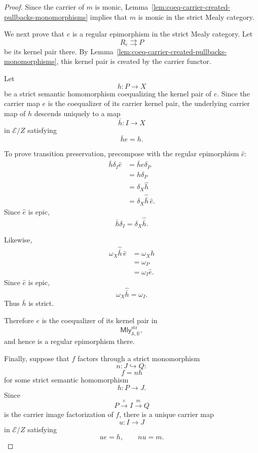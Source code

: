 \begin{proof}
    Since the carrier of \(m\) is monic,
    Lemma~\ref{lem:coeq-carrier-created-pullbacks-monomorphisms}
    implies that \(m\) is monic in the strict Mealy category.

    We next prove that \(e\) is a regular epimorphism in the strict Mealy
    category. Let
    \[
        R_e\rightrightarrows P
    \]
    be its kernel pair there. By
    Lemma~\ref{lem:coeq-carrier-created-pullbacks-monomorphisms}, this kernel
    pair is created by the carrier functor.

    Let
    \[
        h:P\to X
    \]
    be a strict semantic homomorphism coequalizing the kernel pair of \(e\).
    Since the carrier map \(e\) is the coequalizer of its carrier kernel pair,
    the underlying carrier map of \(h\) descends uniquely to a map
    \[
        \bar h:I\to X
    \]
    in \(\mathcal E/Z\) satisfying
    \[
        \bar h e=h.
    \]

    To prove transition preservation, precompose with the regular epimorphism
    \(\widehat e\):
    \[
    \begin{aligned}
        \bar h\delta_I\widehat e
        &=
        \bar h e\delta_P
        \\
        &=
        h\delta_P
        \\
        &=
        \delta_X\widehat h
        \\
        &=
        \delta_X\widehat{\bar h}\,\widehat e.
    \end{aligned}
    \]
    Since \(\widehat e\) is epic,
    \[
        \bar h\delta_I
        =
        \delta_X\widehat{\bar h}.
    \]

    Likewise,
    \[
    \begin{aligned}
        \omega_X\widehat{\bar h}\,\widehat e
        &=
        \omega_X\widehat h
        \\
        &=
        \omega_P
        \\
        &=
        \omega_I\widehat e.
    \end{aligned}
    \]
    Since \(\widehat e\) is epic,
    \[
        \omega_X\widehat{\bar h}
        =
        \omega_I.
    \]
    Thus \(\bar h\) is strict.

    Therefore \(e\) is the coequalizer of its kernel pair in
    \[
        \mathsf{Mly}^{\mathrm{str}}_{\mathbb A,\mathbb B},
    \]
    and hence is a regular epimorphism there.

    Finally, suppose that \(f\) factors through a strict monomorphism
    \[
        n:J\hookrightarrow Q:
    \]
    \[
        f=nh
    \]
    for some strict semantic homomorphism
    \[
        h:P\to J.
    \]
    Since
    \[
        P\xrightarrow{e}I\xrightarrow{m}Q
    \]
    is the carrier image factorization of \(f\), there is a unique carrier map
    \[
        u:I\to J
    \]
    in \(\mathcal E/Z\) satisfying
    \[
        ue=h,
        \qquad
        nu=m.
    \]


\end{proof}

